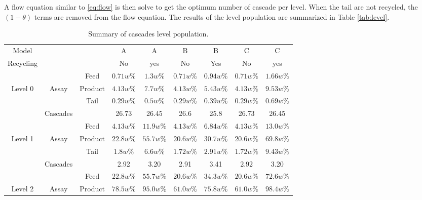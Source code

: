 A flow equation similar to \eqref{eq:flow} is then solve to get the optimum
number of cascade per level. When the tail are not recycled, the $(1-\theta)$
terms are removed from the flow equation.  The results of the level population
are summarized in Table \ref{tab:level}.


\begin{table}[htb]
\centering
  \caption{Summary of cascades level population.}
\begin{tabular}{ccccccccc}
\toprule

Model       &        &           & A         & A         & B         & B       & C         & C          \\
Recycling   &        &           & No        & yes       & No        & Yes     & No        & yes        \\
\midrule                                                                                                 
        &            & Feed      & $0.71w\%$ & $1.3w\%$  & $0.71w\%$ & $0.94w\%$ & $0.71w\%$ & $1.66w\%$ \\
Level 0 & Assay      & Product   & $4.13w\%$ & $7.7w\%$  & $4.13w\%$ & $5.43w\%$ & $4.13w\%$ & $9.53w\%$ \\
        &            & Tail      & $0.29w\%$ & $0.5w\%$  & $0.29w\%$ & $0.39w\%$ & $0.29w\%$ & $0.69w\%$  \\
        & Cascades   &           & 26.73     & 26.45     & 26.6      & 25.8      & 26.73     & 26.45      \\
\midrule                                                                                                 
        &            & Feed      & $4.13w\%$ & $11.9w\%$ & $4.13w\%$ & $6.84w\%$ & $4.13w\%$ & $13.0w\%$ \\
Level 1 & Assay      & Product   & $22.8w\%$ & $55.7w\%$ & $20.6w\%$ & $30.7w\%$ & $20.6w\%$ & $69.8w\%$ \\
        &            & Tail      & $1.8w\%$  & $6.6w\%$  & $1.72w\%$ & $2.91w\%$ & $1.72w\%$ & $9.43w\%$  \\
        & Cascades   &           & 2.92       & 3.20      & 2.91      & 3.41     & 2.92      & 3.20       \\
\midrule                                                                                                 
        &            & Feed      & $22.8w\%$ & $55.7w\%$ & $20.6w\%$ & $34.3w\%$ & $20.6w\%$ & $72.6w\%$ \\
Level 2 & Assay      & Product   & $78.5w\%$ & $95.0w\%$ & $61.0w\%$ & $75.8w\%$ & $61.0w\%$ & $98.4w\%$ \\

\end{tabular}
\end{table}
